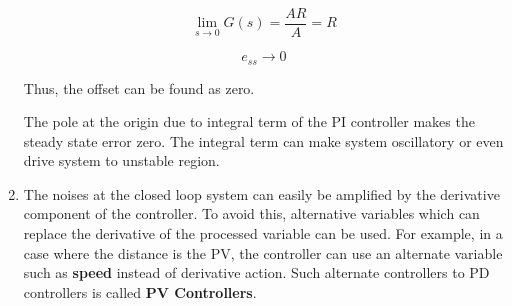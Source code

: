 \documentclass[a4paper,12pt]{article}
\begin{document}
\begin{enumerate}
			$$ \lim_{s \to 0} G(s)=\frac{AR}{A}=R $$
				
			$$ e_{ss} \to 0 $$
				
			Thus, the offset can be found as zero.
				
			The pole at the origin due to integral term of the PI controller makes the steady state error zero. The integral term can make system oscillatory or even drive system to unstable region.


		\item The noises at the closed loop system can easily be amplified by the derivative component of the controller. To avoid this, alternative variables which can replace the derivative of the processed variable can be used. For example, in a case where the distance is the PV, the controller can use an alternate variable such as \textbf{speed} instead of derivative action. Such alternate controllers to PD controllers is called \textbf{PV Controllers}.
	\end{enumerate}
		
					

		
		

	
% 
\end{document}
